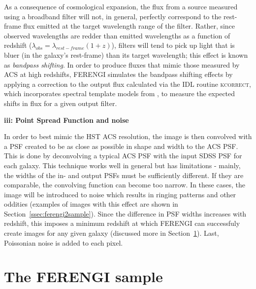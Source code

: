 As a consequence of cosmological expansion, the flux from a source measured using a broadband filter will not, in general, perfectly correspond to the rest-frame flux emitted at the target wavelength range of the filter. Rather, since observed wavelengths are redder than emitted wavelengths as a function of redshift ($\lambda_{obs}=\lambda_{rest-frame}(1+z)$), filters will tend to pick up light that is bluer (in the galaxy's rest-frame) than its target wavelength; this effect is known as \emph{bandpass shifting}. In order to produce fluxes that mimic those measured by ACS at high redshifts, FERENGI simulates the bandpass shifting effects by applying a correction to the output flux calculated via the IDL routine \textsc{kcorrect}, which incorporates spectral template models from \citet{Bruzual2003}, to measure the expected shifts in flux for a given output filter.   

\textbf{iii: Point Spread Function and noise}

In order to best mimic the HST ACS resolution, the image is then convolved with a PSF created to be as close as possible in shape and width to the ACS PSF. This is done by deconvolving a typical ACS PSF with the input SDSS PSF for each galaxy. This technique works well in general but has limitations - mainly, the widths of the in- and output PSFs must be sufficiently different. If they are comparable, the convolving function can become too narrow. In these cases, the image will be introduced to noise which results in ringing patterns and other oddities (examples of images with this effect are shown in Section~\ref{ssec:ferengi2sample}). Since the difference in PSF widths increases with redshift, this imposes a minimum redshift at which FERENGI can successfuly create images for any given galaxy (discussed more in Section~\ref{sec:ferengi1sample}). Last, Poissonian noise is added to each pixel.



\section{The FERENGI sample}
\label{sec:ferengi1sample}

